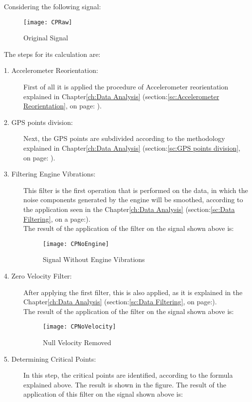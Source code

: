 \documentclass[tesi]{subfiles}
\begin{document}
\noindent Considering the following signal:

\begin{figure}[H]
\centering
\texttt{[image: CPRaw]}
\caption{Original Signal}
\end{figure}


\noindent The steps for its calculation are:
\begin{description}
\item[1. Accelerometer Reorientation:] First of all it is applied the procedure of Accelerometer reorientation explained in Chapter\ref{ch:Data Analysis} (section:\ref{sc:Accelerometer Reorientation}, on page: \pageref{sc:Accelerometer Reorientation}).
\item[2. GPS points division:] Next, the GPS points are subdivided according to the methodology explained in Chapter\ref{ch:Data Analysis} (section:\ref{sc:GPS points division}, on page: \pageref{sc:GPS points division}).
\item[3. Filtering Engine Vibrations:] This filter is the first operation that is performed on the data, in which the noise components generated by the engine will be smoothed, according to the application seen in the Chapter\ref{ch:Data Analysis} (section:\ref{sc:Data Filtering}, on a page:\pageref{sssc:Remove Engine Vibrations Filter}).\\
The result of the application of the filter on the signal shown above is:
 \begin{figure}[H]
\centering
\texttt{[image: CPNoEngine]}
\caption{Signal Without Engine Vibrations}
\end{figure}
\item[4. Zero Velocity Filter:] After applying the first filter, this is also applied, as it is explained in the Chapter\ref{ch:Data Analysis} (section:\ref{sc:Data Filtering}, on page:\pageref{sssc:Zero Velocity Filter}).\\
The result of the application of the filter on the signal shown above is:
 \begin{figure}[H]
\centering
\texttt{[image: CPNoVelocity]}
\caption{Null Velocity Removed}
\end{figure}
\item[5. Determining Critical Points:] In this step, the critical points are identified, according to the formula explained above. The result is shown in the figure.
The result of the application of this filter on the signal shown above	 is:
 \begin{figure}[H]
\centering

\end{figure}
\end{description}
\end{document}
